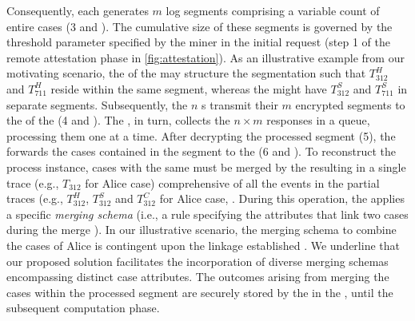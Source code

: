 Consequently, each  generates $m$ log segments comprising a variable count of entire cases (3 and ). The cumulative size of these segments is governed by the threshold parameter specified by the miner in the initial request (step 1 of the remote attestation phase in \cref{fig:attestation}). As an illustrative example from our motivating scenario, the  of the  may structure the segmentation such that $T^H_{312}$ and $T^H_{711}$ reside within the same segment, whereas the  might have $T^S_{312}$ and $T^S_{711}$ in separate segments. Subsequently, the $n$ s transmit their $m$ encrypted segments to the  of the  (4 and ). The , in turn, collects the $n \times m$ responses in a queue, processing them one at a time. After decrypting the processed segment (5), the  forwards the cases contained in the segment to the  (6 and ). To reconstruct the process instance, cases %
with the same \NewJ{{\CId}} must be merged by the  resulting in a single trace (e.g., $T_{312}$ for Alice case) comprehensive of all the events in the partial traces (e.g., $T^H_{312}$, $T^S_{312}$ and $T^C_{312}$ for Alice case, . During this operation, the  applies a specific \textit{merging schema} (i.e., a rule specifying the attributes that link two cases during the merge \cite{claes2014merging}). In our illustrative scenario, the merging schema to combine the cases of Alice is contingent upon the linkage established . %
We underline that our proposed solution facilitates the incorporation of diverse merging schemas encompassing distinct case attributes. The outcomes arising from merging the cases within the processed segment are securely stored by the  in the , until the subsequent computation phase.

